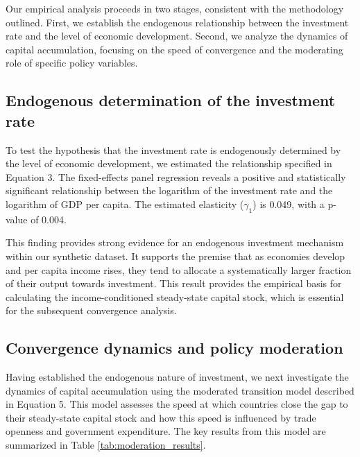 \documentclass[]{article}
\begin{document}
Our empirical analysis proceeds in two stages, consistent with the methodology outlined. First, we establish the endogenous relationship between the investment rate and the level of economic development. Second, we analyze the dynamics of capital accumulation, focusing on the speed of convergence and the moderating role of specific policy variables.

\subsection{Endogenous determination of the investment rate}
To test the hypothesis that the investment rate is endogenously determined by the level of economic development, we estimated the relationship specified in Equation 3. The fixed-effects panel regression reveals a positive and statistically significant relationship between the logarithm of the investment rate and the logarithm of GDP per capita. The estimated elasticity ($\gamma_1$) is 0.049, with a p-value of 0.004.

This finding provides strong evidence for an endogenous investment mechanism within our synthetic dataset. It supports the premise that as economies develop and per capita income rises, they tend to allocate a systematically larger fraction of their output towards investment. This result provides the empirical basis for calculating the income-conditioned steady-state capital stock, which is essential for the subsequent convergence analysis.

\subsection{Convergence dynamics and policy moderation}
Having established the endogenous nature of investment, we next investigate the dynamics of capital accumulation using the moderated transition model described in Equation 5. This model assesses the speed at which countries close the gap to their steady-state capital stock and how this speed is influenced by trade openness and government expenditure. The key results from this model are summarized in Table \ref{tab:moderation_results}.
\end{document}
